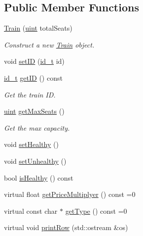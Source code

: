 \subsection*{Public Member Functions}
\begin{DoxyCompactItemize}
\item 
\mbox{\hyperlink{classTrain_aa965be5e5d076d2743301c5d75ce4401}{Train}} (\mbox{\hyperlink{project__utils_8h_a91ad9478d81a7aaf2593e8d9c3d06a14}{uint}} total\+Seats)
\begin{DoxyCompactList}\small\item\em Construct a new \mbox{\hyperlink{classTrain}{Train}} object. \end{DoxyCompactList}\item 
void \mbox{\hyperlink{classTrain_a9a8b1feb180da07e26c90919a0c32406}{set\+ID}} (\mbox{\hyperlink{project__utils_8h_a8f3a969054ad2200720b96e7e23dd4e1}{id\+\_\+t}} id)
\item 
\mbox{\hyperlink{project__utils_8h_a8f3a969054ad2200720b96e7e23dd4e1}{id\+\_\+t}} \mbox{\hyperlink{classTrain_a7310ae0bc5b43ea392e4fa62630ee56b}{get\+ID}} () const
\begin{DoxyCompactList}\small\item\em Get the train ID. \end{DoxyCompactList}\item 
\mbox{\hyperlink{project__utils_8h_a91ad9478d81a7aaf2593e8d9c3d06a14}{uint}} \mbox{\hyperlink{classTrain_a93cd372664bac4ba28fa36e40316444a}{get\+Max\+Seats}} ()
\begin{DoxyCompactList}\small\item\em Get the max capacity. \end{DoxyCompactList}\item 
void \mbox{\hyperlink{classTrain_a73909d49761b5152ee3bfc2e1b9d1325}{set\+Healthy}} ()
\item 
void \mbox{\hyperlink{classTrain_a2e6fc233ded428364670c07a46f08891}{set\+Unhealthy}} ()
\item 
bool \mbox{\hyperlink{classTrain_a68d9748a7cb2d1c8c49450b1fb4ad894}{is\+Healthy}} () const
\item 
virtual float \mbox{\hyperlink{classTrain_a2f8a45aaa96058a2675422d206221964}{get\+Price\+Multiplyer}} () const =0
\item 
virtual const char $\ast$ \mbox{\hyperlink{classTrain_ad2bd424547b5be4e3fa8e491f1ce790d}{get\+Type}} () const =0
\item 
virtual void \mbox{\hyperlink{classTrain_a3fd1c87c2152aa96cc6928f0aea37e21}{print\+Row}} (std\+::ostream \&os)
\end{DoxyCompactItemize}
